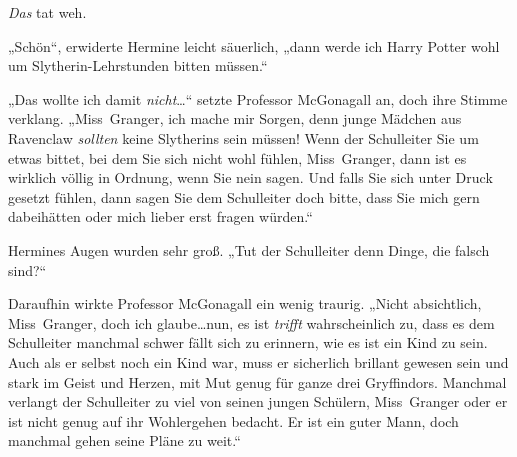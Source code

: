 \emph{Das} tat weh.

„Schön“, erwiderte Hermine leicht säuerlich, „dann werde ich Harry Potter wohl um Slytherin-Lehrstunden bitten müssen.“

„Das wollte ich damit \emph{nicht}…“ setzte Professor McGonagall an, doch ihre Stimme verklang. „Miss~Granger, ich mache mir Sorgen, denn junge Mädchen aus Ravenclaw \emph{sollten} keine Slytherins sein müssen! Wenn der Schulleiter Sie um etwas bittet, bei dem Sie sich nicht wohl fühlen, Miss~Granger, dann ist es wirklich völlig in Ordnung, wenn Sie nein sagen. Und falls Sie sich unter Druck gesetzt fühlen, dann sagen Sie dem Schulleiter doch bitte, dass Sie mich gern dabeihätten oder mich lieber erst fragen würden.“

Hermines Augen wurden sehr groß. „Tut der Schulleiter denn Dinge, die falsch sind?“

Daraufhin wirkte Professor McGonagall ein wenig traurig. „Nicht absichtlich, Miss~Granger, doch ich glaube…nun, es ist \emph{trifft} wahrscheinlich zu, dass es dem Schulleiter manchmal schwer fällt sich zu erinnern, wie es ist ein Kind zu sein. Auch als er selbst noch ein Kind war, muss er sicherlich brillant gewesen sein und stark im Geist und Herzen, mit Mut genug für ganze drei Gryffindors. Manchmal verlangt der Schulleiter zu viel von seinen jungen Schülern, Miss~Granger oder er ist nicht genug auf ihr Wohlergehen bedacht. Er ist ein guter Mann, doch manchmal gehen seine Pläne zu weit.“

